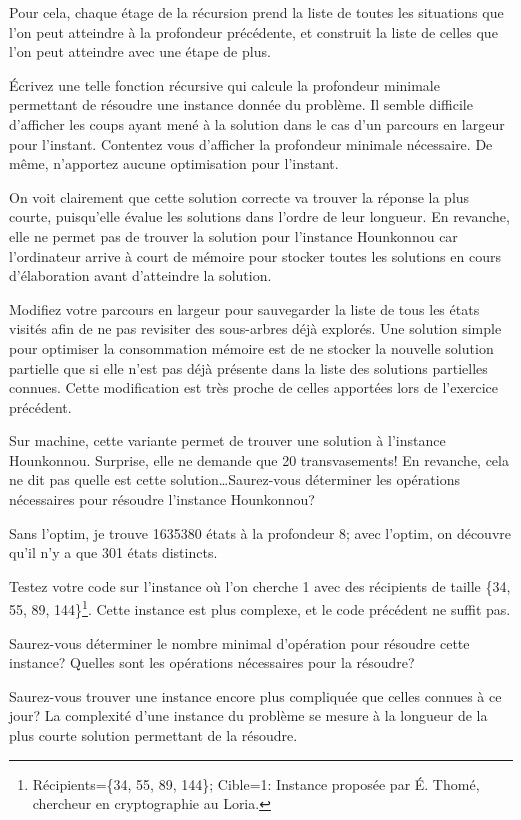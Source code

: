 \documentclass[10pt]{article}\usepackage[nu]{esial}%
\begin{document}
\begin{Exercice}
Pour cela, chaque étage de la récursion prend la liste de toutes les situations
que l'on peut atteindre à la profondeur précédente, et construit la liste de
celles que l'on peut atteindre avec une étape de plus.

\Question Écrivez une telle fonction récursive qui calcule la profondeur
minimale permettant de résoudre une instance donnée du problème. Il semble
difficile d'afficher les coups ayant mené à la solution dans le cas d'un
parcours en largeur pour l'instant. Contentez vous d'afficher la profondeur
minimale nécessaire. De même, n'apportez aucune optimisation pour l'instant.

\begin{Reponse}
  \newcommand*\FancyVerbStartString{// BEGIN CHERCHE}
  \newcommand*\FancyVerbStopString{// END CHERCHE}
\end{Reponse}

\Question %
On voit clairement que cette solution correcte va trouver la réponse la plus
courte, puisqu'elle évalue les solutions dans l'ordre de leur longueur. En
revanche, elle ne permet pas de trouver la solution pour l'instance Hounkonnou
car l'ordinateur arrive à court de mémoire pour stocker toutes les solutions en
cours d'élaboration avant d'atteindre la solution.

\Question %
Modifiez votre parcours en largeur pour sauvegarder la liste de tous les états
visités afin de ne pas revisiter des sous-arbres déjà explorés. 
Une solution simple pour optimiser la consommation mémoire est de ne stocker la
nouvelle solution partielle que si elle n'est pas déjà présente dans la liste
des solutions partielles connues. Cette modification est très proche de celles
apportées lors de l'exercice précédent.

Sur machine, cette variante permet de trouver une solution à l'instance
Hounkonnou. Surprise, elle ne demande que 20 transvasements! En revanche, cela
ne dit pas quelle est cette solution\ldots Saurez-vous déterminer les opérations
nécessaires pour résoudre l'instance Hounkonnou?

\begin{Reponse}
  Sans l'optim, je trouve 1635380 états à la profondeur 8; avec l'optim, on
  découvre qu'il n'y a que 301 états distincts.
\end{Reponse}

\Question %
Testez votre code sur l'instance où l'on cherche 1 avec des récipients de taille
\{34, 55, 89, 144\}\footnote{Récipients=\{34, 55, 89, 144\}; Cible=1: Instance
  proposée par É. Thomé, chercheur en cryptographie au Loria.}. Cette instance
est plus complexe, et le code précédent ne suffit pas.

Saurez-vous déterminer le nombre minimal d'opération pour résoudre cette
instance? Quelles sont les opérations nécessaires pour la résoudre?

\Question %
Saurez-vous trouver une instance encore plus compliquée que celles connues à ce
jour? La complexité d'une instance du problème se mesure à la longueur de la
plus courte solution permettant de la résoudre.
\end{Exercice}
\end{document}
